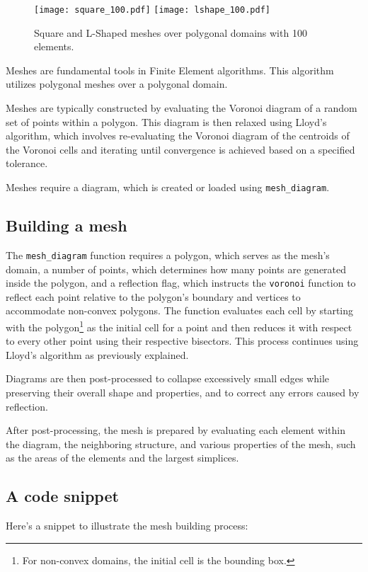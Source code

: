 \begin{figure}[!ht]
	\centering
	\texttt{[image: square\_100.pdf]}
    \texttt{[image: lshape\_100.pdf]}
	\caption{Square and L-Shaped meshes over polygonal domains with 100 elements.}
\end{figure}

Meshes are fundamental tools in Finite Element algorithms. This algorithm utilizes polygonal meshes over a polygonal domain.

Meshes are typically constructed by evaluating the Voronoi diagram of a random set of points within a polygon. This diagram is then relaxed using Lloyd's algorithm, which involves re-evaluating the Voronoi diagram of the centroids of the Voronoi cells and iterating until convergence is achieved based on a specified tolerance.

Meshes require a diagram, which is created or loaded using \lstinline{mesh_diagram}.

\subsection{Building a mesh}

The \lstinline{mesh_diagram} function requires a polygon, which serves as the mesh's domain, a number of points, which determines how many points are generated inside the polygon, and a reflection flag, which instructs the \lstinline{voronoi} function to reflect each point relative to the polygon's boundary and vertices to accommodate non-convex polygons. The function evaluates each cell by starting with the polygon\footnote{For non-convex domains, the initial cell is the bounding box.} as the initial cell for a point and then reduces it with respect to every other point using their respective bisectors. This process continues using Lloyd's algorithm as previously explained.

Diagrams are then post-processed to collapse excessively small edges while preserving their overall shape and properties, and to correct any errors caused by reflection.

After post-processing, the mesh is prepared by evaluating each element within the diagram, the neighboring structure, and various properties of the mesh, such as the areas of the elements and the largest simplices.

\newpage
\subsection{A code snippet}

Here's a snippet to illustrate the mesh building process:

